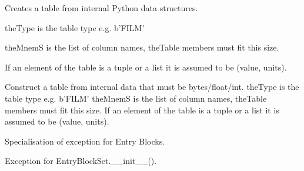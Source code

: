\documentclass[letterpaper,10pt,english]{sphinxmanual}
\begin{document}
\begin{fulllineitems}
\label{\detokenize{ref/LIS/core/LogiRec:TotalDepth.LIS.core.LogiRec.LrTableWrite}}
Creates a table from internal Python data structures.

theType is the table type e.g. b’FILM’

theMnemS is the list of column names, theTable members must fit this size.

If an element of the table is a tuple or a list it is assumed to be (value, units).

\begin{fulllineitems}
\label{\detokenize{ref/LIS/core/LogiRec:TotalDepth.LIS.core.LogiRec.LrTableWrite.__init__}}
Construct a table from internal data that must be bytes/float/int.
theType is the table type e.g. b’FILM’
theMnemS is the list of column names, theTable members must fit this size.
If an element of the table is a tuple or a list it is assumed to be (value, units).

\end{fulllineitems}


\end{fulllineitems}


\begin{fulllineitems}
\label{\detokenize{ref/LIS/core/LogiRec:TotalDepth.LIS.core.LogiRec.ExceptionEntryBlock}}
Specialisation of exception for Entry Blocks.

\end{fulllineitems}


\begin{fulllineitems}
\label{\detokenize{ref/LIS/core/LogiRec:TotalDepth.LIS.core.LogiRec.ExceptionEntryBlockSetInit}}
Exception for EntryBlockSet.\_\_init\_\_().

\end{fulllineitems}
\end{document}

